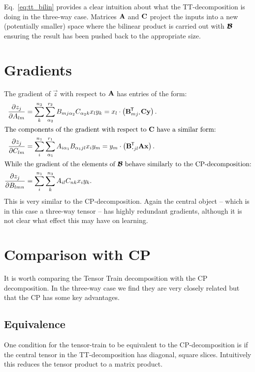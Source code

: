 Eq.~\eqref{eq:tt_bilin} provides a clear intuition about what the TT-decomposition is doing in 
the three-way case.
Matrices \(\mathbf{A}\) and \(\mathbf{C}\) project the inputs into a new (potentially smaller) space
where the bilinear product is carried out with \(\bm{\mathcal{B}}\) ensuring the result has been pushed
back to the appropriate size.

\section{Gradients}
The gradient of \(\vec{z}\) with respect to \(\mathbf{A}\) has entries of the form:
\begin{align}
	\frac{\partial z_j}{\partial A_{lm}} 
	    &= \sum_{k}^{n_3}
		\sum_{\alpha_2}^{r_2}B_{m j\alpha_2}C_{\alpha_2k}x_ly_k
		= x_l \cdot \left(\tran{\vec{B}_{mj\midbullet}}\mat{C}\vec{y}\right). \\
\intertext{The components of the gradient with respect to \(\mat{C}\) have a similar form:}
	\frac{\partial z_j}{\partial C_{lm}} 
		&= \sum_{i}^{n_1}
		\sum_{\alpha_1}^{r_1}A_{i\alpha_1}B_{\alpha_1jl}x_iy_m 
		= y_m \cdot \left(\tran{\vec{B}_{\midbullet jl}}\mat{A}\vec{x}\right). \\
\intertext{While the gradient of the elements of \(\tensor{B}\) behave similarly
	to the CP-decomposition:}
	\frac{\partial z_j}{\partial B_{lmn}} 
		&= \sum_{i}^{n_1}\sum_{k}^{n_3}
		A_{il}C_{nk}x_iy_k. \\
\end{align}
This is very similar to the CP-decomposition. Again the central
object -- which is in this case a three-way tensor -- has highly redundant gradients, although it
is not clear what effect this may have on learning.


\section{Comparison with CP}
It is worth comparing the Tensor Train decomposition with the CP decomposition. In the three-way
case we find they are very closely related but that the CP has some key advantages. 

\subsection{Equivalence}
One condition for the tensor-train to be equivalent to the CP-decomposition is if the central
tensor in the TT-decomposition has diagonal, square slices. Intuitively this reduces the tensor
product to a matrix product. 

